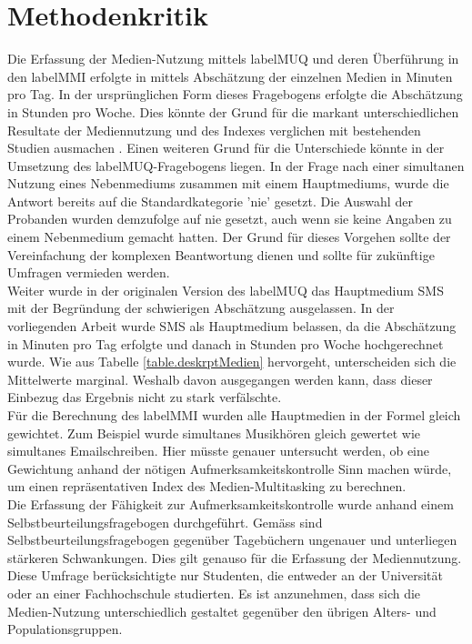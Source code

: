 \section{Methodenkritik}\label{section.diskussion.methodenkritik}
Die Erfassung der Medien-Nutzung mittels \gls{labelMUQ} und deren Überführung in den \gls{labelMMI} erfolgte in mittels Abschätzung der einzelnen Medien in Minuten pro Tag. In der ursprünglichen Form dieses Fragebogens erfolgte die Abschätzung in Stunden pro Woche. Dies könnte der Grund für die markant unterschiedlichen Resultate der Mediennutzung und des Indexes verglichen mit bestehenden Studien ausmachen \cite{Ophir2009,Alzahabi2013}. Einen weiteren Grund für die Unterschiede könnte in der Umsetzung des \gls{labelMUQ}-Fragebogens liegen. In der Frage nach einer simultanen Nutzung eines Nebenmediums zusammen mit einem Hauptmediums, wurde die Antwort bereits auf die Standardkategorie 'nie' gesetzt. Die Auswahl der Probanden wurden demzufolge auf nie gesetzt, auch wenn sie keine Angaben zu einem Nebenmedium gemacht hatten. Der Grund für dieses Vorgehen sollte der Vereinfachung der komplexen Beantwortung dienen und sollte für zukünftige Umfragen vermieden werden.\\
Weiter wurde in der originalen Version des \gls{labelMUQ} das Hauptmedium SMS mit der Begründung der schwierigen Abschätzung ausgelassen. In der vorliegenden Arbeit wurde SMS als Hauptmedium belassen, da die Abschätzung in Minuten pro Tag erfolgte und danach in Stunden pro Woche hochgerechnet wurde.  Wie aus Tabelle \ref{table.deskrptMedien} hervorgeht, unterscheiden sich die Mittelwerte marginal. Weshalb davon ausgegangen werden kann, dass dieser Einbezug das Ergebnis nicht zu stark verfälschte.\\
Für die Berechnung des \gls{labelMMI} wurden alle Hauptmedien in der Formel gleich gewichtet. Zum Beispiel wurde simultanes Musikhören gleich gewertet wie simultanes Emailschreiben. Hier müsste genauer untersucht werden, ob eine Gewichtung anhand der nötigen Aufmerksamkeitskontrolle Sinn machen würde, um einen repräsentativen Index des Medien-Multitasking zu berechnen.\\
Die Erfassung der Fähigkeit zur Aufmerksamkeitskontrolle wurde anhand einem Selbstbeurteilungsfragebogen durchgeführt. Gemäss  sind Selbstbeurteilungsfragebogen gegenüber Tagebüchern ungenauer und unterliegen stärkeren Schwankungen. Dies gilt genauso für die Erfassung der Mediennutzung.\\
Diese Umfrage berücksichtigte nur Studenten, die entweder an der Universität oder an einer Fachhochschule studierten. Es ist anzunehmen, dass sich die Medien-Nutzung unterschiedlich gestaltet gegenüber den übrigen Alters- und Populationsgruppen. 
